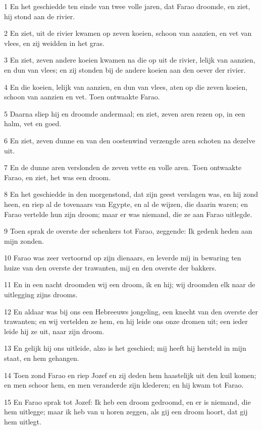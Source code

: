 \par 1 En het geschiedde ten einde van twee volle jaren, dat Farao droomde, en ziet, hij stond aan de rivier.
\par 2 En ziet, uit de rivier kwamen op zeven koeien, schoon van aanzien, en vet van vlees, en zij weidden in het gras.
\par 3 En ziet, zeven andere koeien kwamen na die op uit de rivier, lelijk van aanzien, en dun van vlees; en zij stonden bij de andere koeien aan den oever der rivier.
\par 4 En die koeien, lelijk van aanzien, en dun van vlees, aten op die zeven koeien, schoon van aanzien en vet. Toen ontwaakte Farao.
\par 5 Daarna sliep hij en droomde andermaal; en ziet, zeven aren rezen op, in een halm, vet en goed.
\par 6 En ziet, zeven dunne en van den oostenwind verzengde aren schoten na dezelve uit.
\par 7 En de dunne aren verslonden de zeven vette en volle aren. Toen ontwaakte Farao, en ziet, het was een droom.
\par 8 En het geschiedde in den morgenstond, dat zijn geest verslagen was, en hij zond heen, en riep al de tovenaars van Egypte, en al de wijzen, die daarin waren; en Farao vertelde hun zijn droom; maar er was niemand, die ze aan Farao uitlegde.
\par 9 Toen sprak de overste der schenkers tot Farao, zeggende: Ik gedenk heden aan mijn zonden.
\par 10 Farao was zeer vertoornd op zijn dienaars, en leverde mij in bewaring ten huize van den overste der trawanten, mij en den overste der bakkers.
\par 11 En in een nacht droomden wij een droom, ik en hij; wij droomden elk naar de uitlegging zijns drooms.
\par 12 En aldaar was bij ons een Hebreeuws jongeling, een knecht van den overste der trawanten; en wij vertelden ze hem, en hij leide ons onze dromen uit; een ieder leide hij ze uit, naar zijn droom.
\par 13 En gelijk hij ons uitleide, alzo is het geschied; mij heeft hij hersteld in mijn staat, en hem gehangen.
\par 14 Toen zond Farao en riep Jozef en zij deden hem haastelijk uit den kuil komen; en men schoor hem, en men veranderde zijn klederen; en hij kwam tot Farao.
\par 15 En Farao sprak tot Jozef: Ik heb een droom gedroomd, en er is niemand, die hem uitlegge; maar ik heb van u horen zeggen, als gij een droom hoort, dat gij hem uitlegt.
